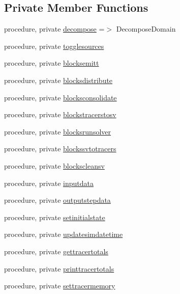 \subsection*{Private Member Functions}
\begin{DoxyCompactItemize}
\item 
procedure, private \mbox{\hyperlink{structsimulation__mod_1_1simulation__class_a559d8d450db2c6b568cb6e0e4dbab350}{decompose}} =$>$ Decompose\+Domain
\item 
procedure, private \mbox{\hyperlink{structsimulation__mod_1_1simulation__class_a2394700a952ccf667b61d53764c73a54}{togglesources}}
\item 
procedure, private \mbox{\hyperlink{structsimulation__mod_1_1simulation__class_a6e740eee52324299ca5f6acd98d0c657}{blocksemitt}}
\item 
procedure, private \mbox{\hyperlink{structsimulation__mod_1_1simulation__class_a06672383d5978e81af6836eb6ebfd46a}{blocksdistribute}}
\item 
procedure, private \mbox{\hyperlink{structsimulation__mod_1_1simulation__class_acc64fd9769d45473cb6cc2ce12471c5a}{blocksconsolidate}}
\item 
procedure, private \mbox{\hyperlink{structsimulation__mod_1_1simulation__class_ad03b37cbdf652e29aaeb3b39bed32661}{blockstracerstosv}}
\item 
procedure, private \mbox{\hyperlink{structsimulation__mod_1_1simulation__class_aa4e34759252b0517c37c79c95ece1167}{blocksrunsolver}}
\item 
procedure, private \mbox{\hyperlink{structsimulation__mod_1_1simulation__class_a3d1841e43f69c4e5c705244c080af873}{blockssvtotracers}}
\item 
procedure, private \mbox{\hyperlink{structsimulation__mod_1_1simulation__class_a468cbc4545886a696123087bfaf42de4}{blockscleansv}}
\item 
procedure, private \mbox{\hyperlink{structsimulation__mod_1_1simulation__class_af3d29e42c561074ea7048db65e6878e1}{inputdata}}
\item 
procedure, private \mbox{\hyperlink{structsimulation__mod_1_1simulation__class_aaef8771dbe443c43b1355437bfa9ef4a}{outputstepdata}}
\item 
procedure, private \mbox{\hyperlink{structsimulation__mod_1_1simulation__class_aeb84b150c76e399c3dc33fbc3f7874ae}{setinitialstate}}
\item 
procedure, private \mbox{\hyperlink{structsimulation__mod_1_1simulation__class_a4b705d6b8829ece4018bde0dbadd0477}{updatesimdatetime}}
\item 
procedure, private \mbox{\hyperlink{structsimulation__mod_1_1simulation__class_ab22e46320d4a3dd0f2739894d1165a85}{gettracertotals}}
\item 
procedure, private \mbox{\hyperlink{structsimulation__mod_1_1simulation__class_a8ddba2b86c2137f5dfc7fcd301badd66}{printtracertotals}}
\item 
procedure, private \mbox{\hyperlink{structsimulation__mod_1_1simulation__class_a7cabf864e327d6e35f6cb7bd85b1db6a}{settracermemory}}
\end{DoxyCompactItemize}
